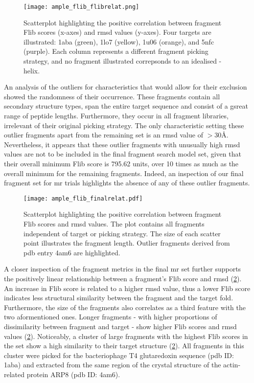 \begin{figure}[H]
	\centering
	\texttt{[image: ample\_flib\_flibrelat.png]}
	\caption[Correlation analysis for Flib score and \gls{rmsd}]{Scatterplot highlighting the positive correlation between fragment Flib scores (x-axes) and \gls{rmsd} values (y-axes). Four targets are illustrated: 1aba (green), 1lo7 (yellow), 1u06 (orange), and 5nfc (purple). Each column represents a different fragment picking strategy, and no fragment illustrated correpsonds to an idealised \textalpha-helix.}
	\label{fig:ample_flib_flibrelat}
\end{figure}

An analysis of the outliers for characteristics that would allow for their exclusion showed the randomness of their occurrence. These fragments contain all secondary structure types, span the entire target sequence and consist of a gsreat range of peptide lengths. Furthermore, they occur in all fragment libraries, irrelevant of their original picking strategy. The only characteristic setting these outlier fragments apart from the remaining set is an \gls{rmsd} value of $>30$\AA. Nevertheless, it appears that these outlier fragments with unusually high \gls{rmsd} values are not to be included in the final fragment search model set, given that their overall minimum Flib score is 795.62 units, over 10 times as much as the overall minimum for the remaining fragments. Indeed, an inspection of our final fragment set for \gls{mr} trials highlights the absence of any of these outlier fragments.

\begin{figure}[H]
	\centering
	\texttt{[image: ample\_flib\_finalrelat.pdf]}
	\caption[Correlation analysis for final Flib \gls{mr} fragments]{Scatterplot highlighting the positive correlation between fragment Flib scores and \gls{rmsd} values. The plot contains all fragments independent of target or picking strategy. The size of each scatter point illustrates the fragment length. Outlier fragments derived from \gls{pdb} entry 4am6 are highlighted.}
	\label{fig:ample_flib_finalrelat}
\end{figure}

A closer inspection of the fragment metrics in the final \gls{mr} set further supports the positively linear relationship between a fragment's Flib score and \gls{rmsd} (\cref{fig:ample_flib_finalrelat}). An increase in Flib score is related to a higher \gls{rmsd} value, thus a lower Flib score indicates less structural similarity between the fragment and the target fold. Furthermore, the size of the fragments also correlates as a third feature with the two aformentioned ones. Longer fragments - with higher proportions of dissimilarity between fragment and target - show higher Flib scores and \gls{rmsd} values (\cref{fig:ample_flib_finalrelat}). Noticeably, a cluster of large fragments with the highest Flib scores in the set show a high similarity to their target structure (\cref{fig:ample_flib_finalrelat}). All fragments in this cluster were picked for the bacteriophage T4 glutaredoxin sequence (\gls{pdb} ID: 1aba) and extracted from the same region of the crystal structure of the actin-related protein ARP8 (\gls{pdb} ID: 4am6). 

